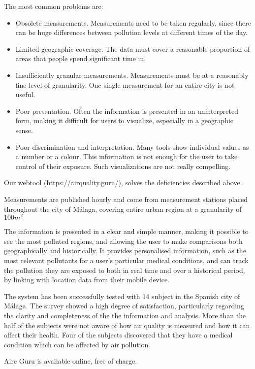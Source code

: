 The most common problems are:

\begin{itemize}

\item Obsolete measurements. Measurements need to be taken regularly, since there can be huge differences
between pollution levels at different times of the day.

\item Limited geographic coverage. The data must cover a reasonable proportion of areas that people spend significant time in.

\item Insufficiently granular measurements. Measurements must be at a reasonably fine level of granularity. One single measurement for an entire city is not useful.

\item Poor presentation. Often the information is presented in an uninterpreted form, making it difficult for users to visualize, especially in a geographic sense.

\item Poor discrimination and interpretation. Many tools show individual values as a number or a colour. This information is not
enough for the user to take control of their exposure. Such visualizations are not really compelling. 

\end{itemize}

Our webtool (https://airquality.guru/), solves the deficiencies described above.

Measurements are published hourly and come from measurement stations placed throughout the 
city of Málaga, covering entire urban region at a granularity of $100m^2$

The information is presented in a clear and simple manner, making it possible to see the most polluted regions,
and allowing the user to make comparisons both geographically and historically. It provides personalised information, such as the most relevant 
pollutants for a user's particular medical conditions, and can track
the pollution they are exposed to both in real time and over a historical period, by linking with location data from their mobile device. 

The system has been successfully tested with 14 subject in the Spanish city of Málaga. The survey showed a high degree of satisfaction, 
particularly regarding the clarity and completeness of the the information and analysis.
More than the half of the subjects were not aware of how air quality is measured and how it 
can affect their health. Four of the subjects discovered that they have a medical 
condition which can be affected by air pollution.
    
Aire Guru is available online, free of charge.

